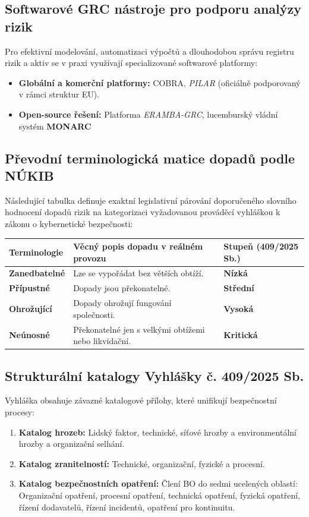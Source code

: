 \documentclass[10pt,a4paper]{article}
\begin{document}
	\subsection{Softwarové GRC nástroje pro podporu analýzy rizik}
	Pro efektivní modelování, automatizaci výpočtů a dlouhodobou správu registru rizik a aktiv se v praxi využívají specializované softwarové platformy:
	\begin{itemize}
		\item \textbf{Globální a komerční platformy:} COBRA, \textit{PILAR} (oficiálně podporovaný v rámci struktur EU).
		\item \textbf{Open-source řešení:} Platforma \textit{ERAMBA-GRC}, lucemburský vládní systém \textbf{MONARC}
	\end{itemize}
	
	\subsection{Převodní terminologická matice dopadů podle NÚKIB}
	Následující tabulka definuje exaktní legislativní párování doporučeného slovního hodnocení dopadů rizik na kategorizaci vyžadovanou prováděcí vyhláškou k zákonu o kybernetické bezpečnosti:
	
	\begin{center}
		\small
		\begin{tabular}{|l|p{9.0cm}|l|}
			\hline
			\textbf{Terminologie} & \textbf{Věcný popis dopadu v reálném provozu} & \textbf{Stupeň (409/2025 Sb.)} \\ \hline
			\textbf{Zanedbatelné} & Lze se vypořádat bez větších obtíží. & \textbf{Nízká} \\ \hline
			\textbf{Přípustné} & Dopady jsou překonatelné. & \textbf{Střední} \\ \hline
			\textbf{Ohrožující} & Dopady ohrožují fungování společnosti. & \textbf{Vysoká} \\ \hline
			\textbf{Neúnosné} & Překonatelné jen s velkými obtížemi nebo likvidační. & \textbf{Kritická} \\ \hline
		\end{tabular}
	\end{center}
	
	\subsection{Strukturální katalogy Vyhlášky č. 409/2025 Sb.}
	Vyhláška obsahuje závazné katalogové přílohy, které unifikují bezpečnostní procesy:
	\begin{enumerate}
		\item \textbf{Katalog hrozeb:} Lidský faktor, technické, síťové hrozby a environmentální hrozby a organizační selhání.
		\item \textbf{Katalog zranitelností:} Technické, organizační, fyzické a procesní.
		\item \textbf{Katalog bezpečnostních opatření:} Člení BO do sedmi ucelených oblastí: Organizační opatření, procesní opatření, technická opatření, fyzická opatření, řízení dodavatelů, řízení incidentů, opatření pro kontinuitu.
	\end{enumerate}
	
\end{document}
